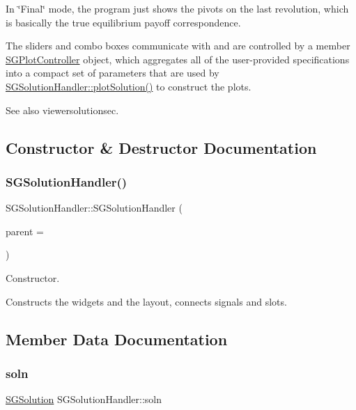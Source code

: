In \char`\"{}\+Final\char`\"{} mode, the program just shows the pivots on the last revolution, which is basically the true equilibrium payoff correspondence.

The sliders and combo boxes communicate with and are controlled by a member \hyperlink{classSGPlotController}{S\+G\+Plot\+Controller} object, which aggregates all of the user-\/provided specifications into a compact set of parameters that are used by \hyperlink{classSGSolutionHandler_a1096133ea0ff25fb447a0d56cdb29688}{S\+G\+Solution\+Handler\+::plot\+Solution()} to construct the plots.

See also viewersolutionsec. 

\subsection{Constructor \& Destructor Documentation}
\mbox{\label{classSGSolutionHandler_ae1158f6e80ba8cc08c6d3e23f2bd1fbd}} 
\subsubsection{\texorpdfstring{S\+G\+Solution\+Handler()}{SGSolutionHandler()}}
{\footnotesize\ttfamily S\+G\+Solution\+Handler\+::\+S\+G\+Solution\+Handler (\begin{DoxyParamCaption}\item[{Q\+Widget $\ast$}]{parent = {} }\end{DoxyParamCaption})}



Constructor. 

Constructs the widgets and the layout, connects signals and slots. 

\subsection{Member Data Documentation}
\mbox{\label{classSGSolutionHandler_a9d13b2690f62b56e3457e0b9a5dfea0d}} 
\subsubsection{\texorpdfstring{soln}{soln}}
{\footnotesize\ttfamily \hyperlink{classSGSolution}{S\+G\+Solution} S\+G\+Solution\+Handler\+::soln\hspace{0.3cm}{\ttfamily [private]}}



